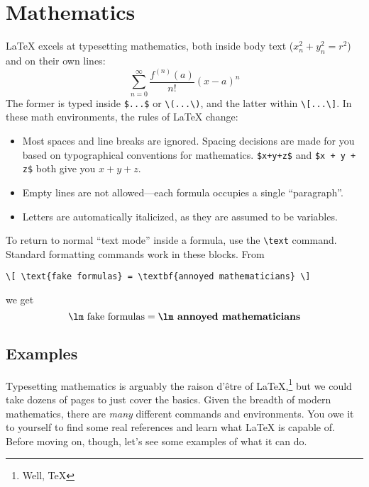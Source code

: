 \chapter{Mathematics}
\label{math}

\LaTeX{} excels at typesetting mathematics, both inside body text
($x_n^2+y_n^2=r^2$) and on their own lines:
\[\sum_{n=0}^{\infty} \frac{f^{(n)} (a)}{n!} (x - a)^n\]
The former is typed inside \verb|$...$| or \verb|\(...\)|,
and the latter within \verb|\[...\]|.
In these math environments, the rules of \LaTeX{} change:
\begin{itemize}
\item Most spaces and line breaks are ignored.
    Spacing decisions are made for you based on
    typographical conventions for mathematics.
    \verb|$x+y+z$| and \verb|$x + y + z$| both give you $x+y+z$.
\item Empty lines are not allowed---each formula occupies a single
    ``paragraph''\quotekern.
\item Letters are automatically italicized, as they are assumed to be variables.
\end{itemize}
To return to normal ``text mode'' inside a formula, use the \verb|\text| command.
Standard formatting commands work in these blocks.
From
\begin{leftfigure}
\begin{lstlisting}
\[ \text{fake formulas} = \textbf{annoyed mathematicians} \]
\end{lstlisting}
\end{leftfigure}
we get
\[ \text{\lm fake formulas} = \textbf{\lm annoyed mathematicians} \]

\section{Examples}

Typesetting mathematics is arguably the raison d'être of
\LaTeX,\punckern\footnote{Well, \TeX} but we could
take dozens of pages to just cover the basics.
Given the breadth of modern mathematics,
there are \emph{many} different commands and environments.
You owe it to yourself to find some real references and learn what \LaTeX{}
is capable of.
Before moving on, though, let's see some examples of what it can do.


